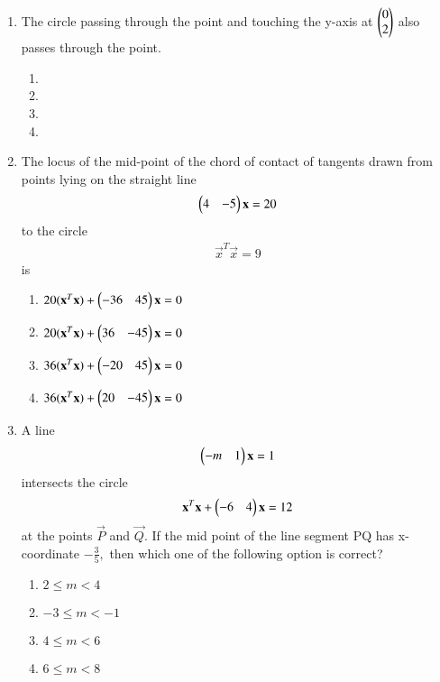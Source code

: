 \begin{enumerate}[label=\arabic*.,ref=\thesubsection.\theenumi]
\item The circle passing through the point  and touching the y-axis at $\begin{pmatrix}0 \\ 2\end{pmatrix}$ also passes through the point.
\begin{enumerate}
\item {}
\item {}
\item {}
\item {}
\end{enumerate}	    
    
\item The locus of the mid-point of the chord of contact of tangents drawn from points lying on the straight line 
\begin{align}
\begin{pmatrix}4&-5\end{pmatrix}\mathbf{x}=20
\end{align}
to the circle 
\begin{align}
\vec{x}^T\vec{x}=9
\end{align} is
\begin{enumerate}
\item $20( \mathbf{x}^T\mathbf{x})+\begin{pmatrix}-36&45\end{pmatrix}\mathbf{x}=0$
\item $20(\mathbf{x}^T\mathbf{x})+\begin{pmatrix}36&-45\end{pmatrix}\mathbf{x}=0$
\item $36( \mathbf{x}^T\mathbf{x})+\begin{pmatrix}-20&45\end{pmatrix}\mathbf{x}=0$
\item  $36( \mathbf{x}^T\mathbf{x})+\begin{pmatrix}20&-45\end{pmatrix}\mathbf{x}=0$  
\end{enumerate}
    
\item A line 
\begin{align}
\begin{pmatrix}-m & 1\end{pmatrix}\mathbf{x}=1
\end{align} intersects the circle 
\begin{align} 
\mathbf{x}^T\mathbf{x}+\begin{pmatrix}-6&4\end{pmatrix}\mathbf{x}=12
\end{align}
at the points $\vec{P}$ and $\vec{Q}.$ If the mid point of the line segment PQ has x-coordinate $-\frac{3}{5},$ then which one of the following option is correct?
\begin{enumerate}
\item $  2 \leq m <  4 $
\item $ -3 \leq m < -1 $
\item $  4 \leq m <  6 $
\item $  6 \leq m <  8$
\end{enumerate}
 

\end{enumerate}
